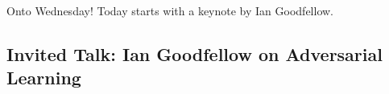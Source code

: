 Onto Wednesday! Today starts with a keynote by Ian Goodfellow. \\

\subsection{Invited Talk: Ian Goodfellow on Adversarial Learning}

